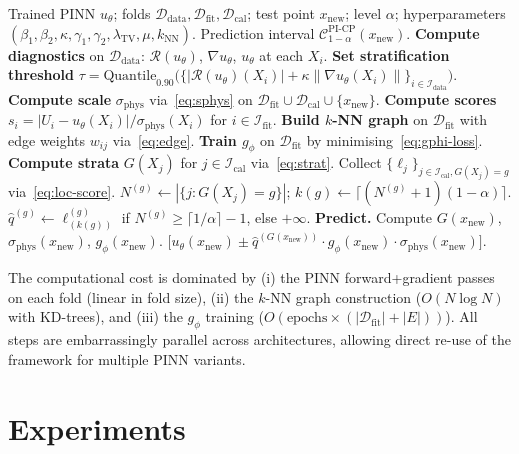 \documentclass[11pt]{article}
\theoremstyle{definition}
\theoremstyle{remark}
\newcommand{\Ddata}{\mathcal{D}_{\text{data}}}
\newcommand{\Dfit}{\mathcal{D}_{\text{fit}}}
\newcommand{\Dcal}{\mathcal{D}_{\text{cal}}}
\newcommand{\sphys}{\sigma_{\mathrm{phys}}}
\newcommand{\TV}{\mathrm{TV}}
\newcommand{\PICP}{\mathrm{PI\text{-}CP}}
\newcommand{\Rop}{\mathcal{R}}
\begin{document}
\begin{algorithm}[t]
\caption{Physics-Informed Conformal Prediction (PI-CP)}
\label{alg:picp}
\begin{algorithmic}[1]
\Require Trained PINN $u_\theta$; folds $\Ddata, \Dfit, \Dcal$; test point $x_{\text{new}}$; level $\alpha$; hyperparameters $(\beta_1, \beta_2, \kappa, \gamma_1, \gamma_2, \lambda_{\TV}, \mu, k_{\text{NN}})$.
\Ensure Prediction interval $\mathcal{C}^{\PICP}_{1-\alpha}(x_{\text{new}})$.
\Statex
\State \textbf{Compute diagnostics} on $\Ddata$: $\Rop(u_\theta)$, $\nabla u_\theta$, $u_\theta$ at each $X_i$.
\State \textbf{Set stratification threshold} $\tau = \text{Quantile}_{0.90}\big(\{|\Rop(u_\theta)(X_i)| + \kappa\|\nabla u_\theta(X_i)\|\}_{i \in \mathcal{I}_{\text{data}}}\big)$.
\State \textbf{Compute scale} $\sphys$ via~\eqref{eq:sphys} on $\Dfit \cup \Dcal \cup \{x_{\text{new}}\}$.
\State \textbf{Compute scores} $s_i = |U_i - u_\theta(X_i)|/\sphys(X_i)$ for $i \in \mathcal{I}_{\text{fit}}$.
\State \textbf{Build $k$-NN graph} on $\Dfit$ with edge weights $w_{ij}$ via~\eqref{eq:edge}.
\State \textbf{Train $g_\phi$} on $\Dfit$ by minimising~\eqref{eq:gphi-loss}.
\State \textbf{Compute strata} $G(X_j)$ for $j \in \mathcal{I}_{\text{cal}}$ via~\eqref{eq:strat}.
    \State Collect $\{\ell_j\}_{j \in \mathcal{I}_{\text{cal}}, G(X_j) = g}$ via~\eqref{eq:loc-score}.
    \State $N^{(g)} \gets |\{j : G(X_j) = g\}|$; \quad $k(g) \gets \lceil (N^{(g)} + 1)(1-\alpha) \rceil$.
    \State $\hat{q}^{(g)} \gets \ell^{(g)}_{(k(g))}$ if $N^{(g)} \geq \lceil 1/\alpha \rceil - 1$, else $+\infty$.
\EndFor
\State \textbf{Predict.} Compute $G(x_{\text{new}})$, $\sphys(x_{\text{new}})$, $g_\phi(x_{\text{new}})$.
\State \Return $\big[u_\theta(x_{\text{new}}) \pm \hat{q}^{(G(x_{\text{new}}))} \cdot g_\phi(x_{\text{new}}) \cdot \sphys(x_{\text{new}})\big]$.
\end{algorithmic}
\end{algorithm}

The computational cost is dominated by (i) the PINN forward+gradient passes on each fold (linear in fold size), (ii) the $k$-NN graph construction ($O(N \log N)$ with KD-trees), and (iii) the $g_\phi$ training ($O(\text{epochs} \times (|\Dfit| + |E|))$). All steps are embarrassingly parallel across architectures, allowing direct re-use of the framework for multiple PINN variants.

\section{Experiments}
\label{sec:experiments}
\end{document}
